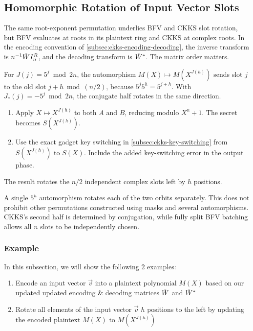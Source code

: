 \subsection{Homomorphic Rotation of Input Vector Slots}
\label{subsec:ckks-rotation}

The same root-exponent permutation underlies BFV and CKKS slot rotation, but BFV evaluates at roots in its plaintext ring and CKKS at complex roots. In the encoding convention of \autoref{subsec:ckks-encoding-decoding}, the inverse transform is $n^{-1}\tilde W I_n^R$, and the decoding transform is $\tilde W^*$. The matrix order matters.

For $J(j)=5^j\bmod2n$, the automorphism $M(X)\mapsto M(X^{J(h)})$ sends slot $j$ to the old slot $j+h\bmod(n/2)$, because $5^j5^h=5^{j+h}$. With $J_*(j)=-5^j\bmod2n$, the conjugate half rotates in the same direction.
\begin{tcolorbox}[title={\textbf{\tboxlabel{\ref*{subsec:ckks-rotation}} CKKS Homomorphic Rotation of Input Vector Slots}}]
\begin{enumerate}
\item Apply $X\mapsto X^{J(h)}$ to both $A$ and $B$, reducing modulo $X^n+1$. The secret becomes $S(X^{J(h)})$.
\item Use the exact gadget key switching in \autoref{subsec:ckks-key-switching} from $S(X^{J(h)})$ to $S(X)$. Include the added key-switching error in the output phase.
\end{enumerate}
The result rotates the $n/2$ independent complex slots left by $h$ positions.
\end{tcolorbox}

 A single $5^h$ automorphism rotates each of the two orbits separately. This does not prohibit other permutations constructed using masks and several automorphisms. CKKS's second half is determined by conjugation, while fully split BFV batching allows all $n$ slots to be independently chosen.


\subsubsection{Example}
\label{subsubsec:ckks-rotation-ex}

In this subsection, we will show the following 2 examples:
\begin{enumerate}
\item Encode an input vector $\vec{v}$ into a plaintext polynomial $M(X)$ based on our updated updated encoding \& decoding matrices $\tilde W$ and $\tilde W^*$
\item Rotate all elements of the input vector $\vec{v}$ $h$ positions to the left by updating the encoded plaintext $M(X)$ to $M(X^{J(h)})$
\end{enumerate}

